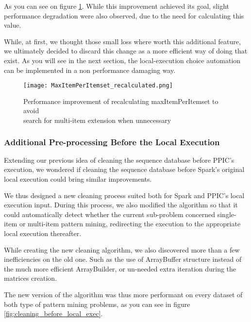 \documentclass{eplmastersthesis}
\begin{document}
As you can see on figure \ref{fig:maxItemPerItemset_recalculated}.
While this improvement achieved its goal, slight performance degradation were also observed, due to the need for calculating this value. \newline

While, at first, we thought those small loss where worth this additional feature, we ultimately decided to discard this change as a more efficient way of doing that exist. As you will see in the next section, the local-execution choice automation can be implemented in a non performance damaging way.

\begin{figure}[h]
  \centering
  \texttt{[image: MaxItemPerItemset\_recalculated.png]}
  \caption[Automatic detection of item-sets type in dataset]{
		Performance improvement of recalculating maxItemPerItemset to avoid \\
		search for multi-item extension when unnecessary
	\endtabular}
  \label{fig:maxItemPerItemset_recalculated}
\end{figure}

\subsubsection{Additional Pre-processing Before the Local Execution}

Extending our previous idea of cleaning the sequence database before PPIC's execution, we wondered if cleaning the sequence database before Spark's original local execution could bring similar improvements. \newline

We thus designed a new cleaning process suited both for Spark and PPIC's local execution input. During this process, we also modified the algorithm so that it could automatically detect whether the current sub-problem concerned single-item or multi-item pattern mining, redirecting the execution to the appropriate local execution thereafter. \newline

While creating the new cleaning algorithm, we also discovered more than a few inefficiencies on the old one. Such as the use of ArrayBuffer structure instead of the much more efficient ArrayBuilder, or un-needed extra iteration during the matrices creation. \newline

The new version of the algorithm was thus more performant on every dataset of both type of pattern mining problems, as you can see in figure \ref{fig:cleaning_before_local_exec}. \newline
\end{document}
